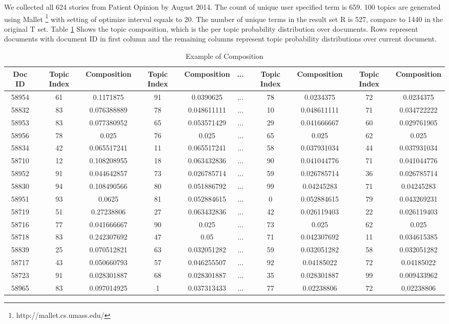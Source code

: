 \documentclass[11pt,twoside]{report}
\begin{document}
We collected all 624 stories from Patient Opinion by August 2014. The count of unique user specified term is 659. 100 topics are generated using Mallet \footnote{http://mallet.cs.umass.edu/} with setting of optimize interval equals to 20.  The number of unique terms in the result set R is 527, compare to 1440 in the original T set. 
Table \ref{table:Composition} Shows the topic composition, which is the per topic probability distribution over documents. Rows represent documents with document ID in first column and the remaining columns represent topic probability distributions over current document. 
\begin{table}[h]
\tiny
\caption{Example of Composition}
\centering
\begin{tabular}{| c | c | c | c | c | c | c | c | c | c |}
\hline\hline
Doc ID & Topic Index & Composition & Topic Index & Composition & ... & Topic Index & Composition & Topic Index & Composition\\
\hline
58954 & 61 & 0.1171875 & 91 & 0.0390625 &...& 78 & 0.0234375 & 72 & 0.0234375\\
\hline
58832 & 83 & 0.076388889 & 78 & 0.048611111 &...& 10 & 0.048611111 & 71 & 0.034722222\\
\hline
58953 & 83 & 0.077380952 & 65 & 0.053571429 &...& 29 & 0.041666667 & 60 & 0.029761905\\
\hline
58956 & 78 & 0.025 & 76 & 0.025 &...& 65 & 0.025 & 62 & 0.025\\
\hline
58834 & 42 & 0.065517241 & 11 & 0.065517241 &...& 58 & 0.037931034 & 44 & 0.037931034\\
\hline
58710 & 12 & 0.108208955 & 18 & 0.063432836 &...& 90 & 0.041044776 & 71 & 0.041044776\\
\hline
58952 & 91 & 0.044642857 & 73 & 0.026785714 &...& 59 & 0.026785714 & 36 & 0.026785714\\
\hline
58830 & 94 & 0.108490566 & 80 & 0.051886792 &...& 99 & 0.04245283 & 71 & 0.04245283\\
\hline
58951 & 93 & 0.0625 & 81 & 0.052884615 &...& 0 & 0.052884615 & 79 & 0.043269231\\
\hline
58719 & 51 & 0.27238806 & 27 & 0.063432836 &...& 42 & 0.026119403 & 22 & 0.026119403\\
\hline
58716 & 77 & 0.041666667 & 90 & 0.025 &...& 73 & 0.025 & 62 & 0.025\\
\hline
58718 & 83 & 0.242307692 & 47 & 0.05 &...& 71 & 0.042307692 & 11 & 0.034615385\\
\hline
58839 & 25 & 0.070512821 & 63 & 0.032051282 &...& 59 & 0.032051282 & 58 & 0.032051282\\
\hline
58717 & 43 & 0.050660793 & 57 & 0.046255507 &...& 92 & 0.04185022 & 72 & 0.04185022\\
\hline
58723 & 91 & 0.028301887 & 68 & 0.028301887 &...& 35 & 0.028301887 & 99 & 0.009433962\\
\hline
58965 & 83 & 0.097014925 & 1 & 0.037313433 &...& 77 & 0.02238806 & 72 & 0.02238806\\
\hline
\end{tabular}
\label{table:Composition}
\end{table}
\end{document}
